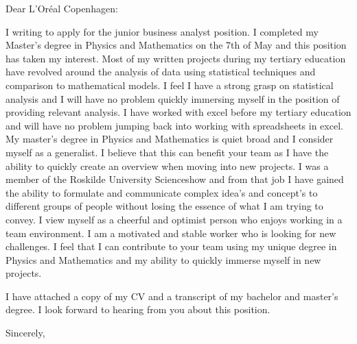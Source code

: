 \documentclass[10pt,a4paper]{letter}
\begin{document}
\begin{letter}{}
\opening{Dear L'Or\'eal Copenhagen:}

I writing to apply for the junior business analyst position. I completed my Master's degree in Physics and Mathematics on the 7th of May and this position has taken my interest. Most of my written projects during my tertiary education have revolved around the analysis of data using statistical techniques and comparison to mathematical models. I feel I have a strong grasp on statistical analysis and I will have no problem quickly immersing myself in the position of providing relevant analysis. I have worked with excel before my tertiary education and will have no problem jumping back into working with spreadsheets in excel. My master's degree in Physics and Mathematics is quiet broad and I consider myself as a generalist. I believe that this can benefit your team as I have the ability to quickly create an overview when moving into new projects. I was a member of the Roskilde University Scienceshow and from that job I have gained the ability to formulate and communicate complex idea's and concept's to different groups of people without losing the essence of what I am trying to convey. I view myself as a cheerful and optimist person who enjoys working in a team environment. I am a motivated and stable worker who is looking for new challenges. I feel that I can contribute to your team using my unique degree in Physics and Mathematics and my ability to quickly immerse myself in new projects. 

I have attached a copy of my CV and a transcript of my bachelor and master's degree. I look forward to hearing from you about this position.   

\closing{Sincerely,}

\end{letter}

\end{document}
